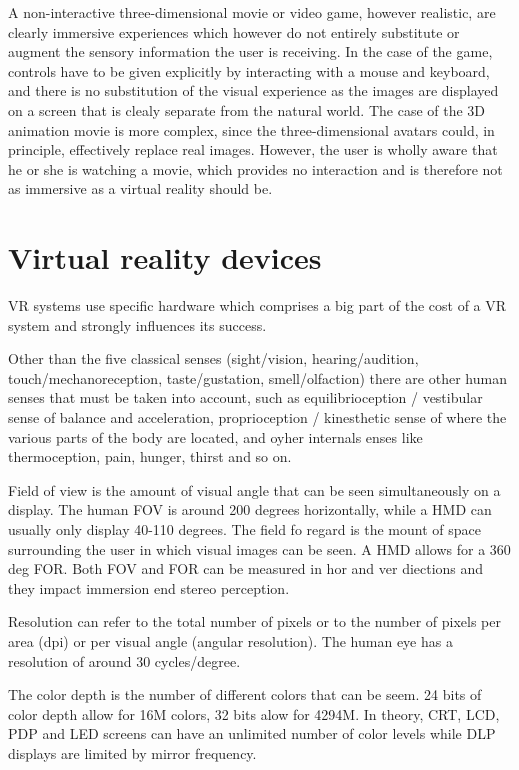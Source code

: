 \documentclass[a4paper]{article}
\begin{document}
A non-interactive three-dimensional movie or video game, however
realistic, are clearly immersive experiences which however do not
entirely substitute or augment the sensory information the user is
receiving.
In the case of the game, controls have to be given explicitly
by interacting with a mouse and keyboard, and there is no substitution
of the visual experience as the images are displayed on a screen that is
clealy separate from the natural world.
The case of the 3D animation
movie is more complex, since the three-dimensional avatars could, in
principle, effectively replace real images.
However, the user is wholly
aware that he or she is watching a movie, which provides no interaction
and is therefore not as immersive as a virtual reality should be.

\section{Virtual reality devices}

VR systems use specific hardware which comprises a big part of the cost
of a VR system and strongly influences its success.

Other than the five classical senses (sight/vision, hearing/audition,
touch/mechanoreception, taste/gustation, smell/olfaction) there are
other human senses that must be taken into account, such as
equilibrioception / vestibular sense of balance and acceleration,
proprioception / kinesthetic sense of where the various parts of the
body are located, and oyher internals enses like thermoception, pain,
hunger, thirst and so on.

Field of view is the amount of visual angle that can be seen
simultaneously on a display.
The human FOV is around 200 degrees
horizontally, while a HMD can usually only display 40-110 degrees.
The
field fo regard is the mount of space surrounding the user in which
visual images can be seen.
A HMD allows for a 360 deg FOR.
Both FOV and
FOR can be measured in hor and ver diections and they impact immersion
end stereo perception.

Resolution can refer to the total number of pixels or to the number of
pixels per area (dpi) or per visual angle (angular resolution).
The
human eye has a resolution of around 30 cycles/degree.

The color depth is the number of different colors that can be seem.
24
bits of color depth allow for 16M colors, 32 bits alow for 4294M.
In
theory, CRT, LCD, PDP and LED screens can have an unlimited number of
color levels while DLP displays are limited by mirror frequency.
\end{document}
